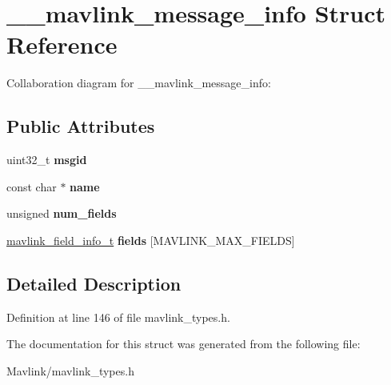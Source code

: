 \hypertarget{struct____mavlink__message__info}{}\section{\+\_\+\+\_\+mavlink\+\_\+message\+\_\+info Struct Reference}
\label{struct____mavlink__message__info}


Collaboration diagram for \+\_\+\+\_\+mavlink\+\_\+message\+\_\+info\+:
\subsection*{Public Attributes}
\begin{DoxyCompactItemize}
\item 
\hypertarget{struct____mavlink__message__info_a4d2150d2bb5fdaa7da1231f3515d8cc4}{}\label{struct____mavlink__message__info_a4d2150d2bb5fdaa7da1231f3515d8cc4} 
uint32\+\_\+t {\bfseries msgid}
\item 
\hypertarget{struct____mavlink__message__info_a5e8b48c51cb8bc44bd844d1c3049ee32}{}\label{struct____mavlink__message__info_a5e8b48c51cb8bc44bd844d1c3049ee32} 
const char $\ast$ {\bfseries name}
\item 
\hypertarget{struct____mavlink__message__info_a0c343bcc1f27884e8c2ab875e7efc2e5}{}\label{struct____mavlink__message__info_a0c343bcc1f27884e8c2ab875e7efc2e5} 
unsigned {\bfseries num\+\_\+fields}
\item 
\hypertarget{struct____mavlink__message__info_a4a15f20958b43cb1282575c6da67a37b}{}\label{struct____mavlink__message__info_a4a15f20958b43cb1282575c6da67a37b} 
\hyperlink{struct____mavlink__field__info}{mavlink\+\_\+field\+\_\+info\+\_\+t} {\bfseries fields} \mbox{[}M\+A\+V\+L\+I\+N\+K\+\_\+\+M\+A\+X\+\_\+\+F\+I\+E\+L\+DS\mbox{]}
\end{DoxyCompactItemize}


\subsection{Detailed Description}


Definition at line 146 of file mavlink\+\_\+types.\+h.



The documentation for this struct was generated from the following file\+:\begin{DoxyCompactItemize}
\item 
Mavlink/mavlink\+\_\+types.\+h\end{DoxyCompactItemize}

